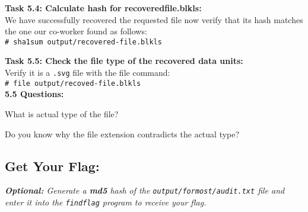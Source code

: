 \documentclass[a4paper,11pt]{article}
\begin{document}
{\noindent
\textbf{Task 5.4: Calculate hash for recoveredfile.blkls:}\\
We have successfully recovered the requested file now verify that its hash matches the one our co-worker found as follows: \\

\noindent
\verb|# sha1sum output/recovered-file.blkls|
}\\

{\noindent
\textbf{Task 5.5: Check the file type of the recovered data units:}\\
Verify it is a \texttt{.svg} file with the file command:\\

\noindent
\verb|# file output/recoved-file.blkls|\\

\noindent
\textbf{5.5 Questions:}
\begin{enumerate*}
	\item What is actual type of the file?
	\item Do you know why the file extension contradicts the actual type?\\
\end{enumerate*}	
}
\subsection*{Get Your Flag:}
\noindent
\textit{\textbf{Optional:} Generate a \textbf{\textit{md5}} hash of the \texttt{output/formost/audit.txt} file and enter it into the \texttt{findflag} program to receive your flag.}
\end{document}
